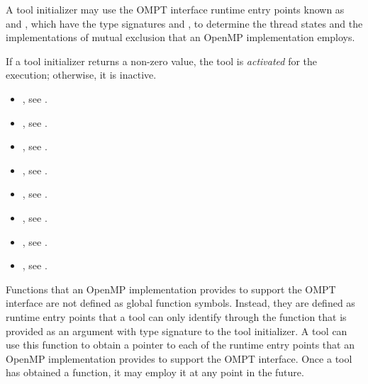 A tool initializer may use the OMPT interface runtime entry points known as 
 and , which have 
the type signatures  and 
, to determine the thread states and the 
implementations of mutual exclusion that an OpenMP implementation employs.

If a tool initializer returns a non-zero value, the tool is \emph{activated} 
for the execution; otherwise, it is inactive.

\crossreferences
\begin{itemize}
\item {}, see
.

\item {}, see .

\item {}, 
see .

\item {}, see .

\item {}, 
see .

\item {}, see .

\item {}, see .

\item {}, see .
\end{itemize}



\label{sec:ompt-bind}

Functions that an OpenMP implementation provides to support the OMPT interface
are not defined as global function symbols. Instead, they are defined as runtime 
entry points that a tool can only identify through the  function that
is provided as an argument with type signature  to 
the tool initializer. A tool can use this function to obtain a pointer to each of 
the runtime entry points that an OpenMP implementation provides to support the OMPT 
interface. Once a tool has obtained a  function, it may employ it at 
any point in the future.


